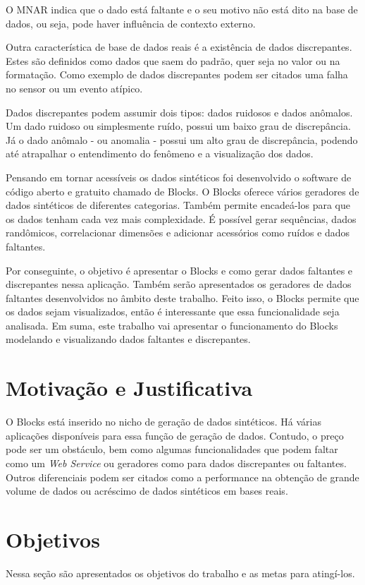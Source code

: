 \documentclass[
	12pt,				%
	openright,			%
	oneside,			%
	a4paper,			%
	english,			%
	brazil				%
	]{abntex2}
\begin{document}
	O MNAR indica que o dado está faltante e o seu motivo não está dito na base de dados, ou seja, pode haver influência de contexto externo.
	\par
	Outra característica de base de dados reais é a existência de dados discrepantes.
	Estes são definidos como dados que saem do padrão, quer seja no valor ou na formatação. \cite{Aggarwal2012}
	Como exemplo de dados discrepantes podem ser citados uma falha no sensor ou um evento atípico.
	\par
	Dados discrepantes podem assumir dois tipos: dados ruidosos e dados anômalos.
	Um dado ruidoso ou simplesmente ruído, possui um baixo grau de discrepância.
	Já o dado anômalo - ou anomalia - possui um alto grau de discrepância, podendo até atrapalhar o entendimento do fenômeno e a visualização dos dados.
	\par
	Pensando em tornar acessíveis os dados sintéticos foi desenvolvido o software de código aberto e gratuito chamado de Blocks.
	O Blocks oferece vários geradores de dados sintéticos de diferentes categorias.
	Também permite encadeá-los para que os dados tenham cada vez mais complexidade.
	É possível gerar sequências, dados randômicos, correlacionar dimensões e adicionar acessórios como ruídos e dados faltantes.
	\par
	Por conseguinte, o objetivo é apresentar o Blocks e como gerar dados faltantes e discrepantes nessa aplicação.
	Também serão apresentados os geradores de dados faltantes desenvolvidos no âmbito deste trabalho.
	Feito isso, o Blocks permite que os dados sejam visualizados, então é interessante que essa funcionalidade seja analisada.
	Em suma, este trabalho vai apresentar o funcionamento do Blocks modelando e visualizando dados faltantes e discrepantes.
	\section{Motivação e Justificativa}
		O Blocks está inserido no nicho de geração de dados sintéticos.
		Há várias aplicações disponíveis para essa função de geração de dados.
		Contudo, o preço pode ser um obstáculo, bem como algumas funcionalidades que podem faltar como um \emph{Web Service} ou geradores como para dados discrepantes ou faltantes.
		Outros diferenciais podem ser citados como a performance na obtenção de grande volume de dados ou acréscimo de dados sintéticos em bases reais.

	\section{Objetivos}
		Nessa seção são apresentados os objetivos do trabalho e as metas para atingí-los.
\end{document}
